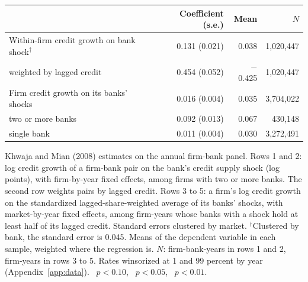 \begin{threeparttable}
    \begin{tabular}{@{}lrrr@{}}
        \toprule
         & Coefficient (s.e.) & Mean & $N$ \\
        \midrule
        Within-firm credit growth on bank shock$^{\dagger}$ & 0.131\sym{***} (0.021) & 0.038 & 1,020,447 \\
        \quad weighted by lagged credit & 0.454\sym{***} (0.052) & $-$0.425 & 1,020,447 \\
        Firm credit growth on its banks' shocks & 0.016\sym{***} (0.004) & 0.035 & 3,704,022 \\
        \quad two or more banks & 0.092\sym{***} (0.013) & 0.067 & 430,148 \\
        \quad single bank & 0.011\sym{***} (0.004) & 0.030 & 3,272,491 \\
        \bottomrule
    \end{tabular}
    \begin{tablenotes}[flushleft]
        \footnotesize
        \item Khwaja and Mian (2008) estimates on the annual firm-bank panel. Rows 1 and 2: log credit growth of a firm-bank pair on the bank's credit supply shock (log points), with firm-by-year fixed effects, among firms with two or more banks. The second row weights pairs by lagged credit. Rows 3 to 5: a firm's log credit growth on the standardized lagged-share-weighted average of its banks' shocks, with market-by-year fixed effects, among firm-years whose banks with a shock hold at least half of its lagged credit. Standard errors clustered by market. $^{\dagger}$Clustered by bank, the standard error is 0.045. Means of the dependent variable in each sample, weighted where the regression is. $N$: firm-bank-years in rows 1 and 2, firm-years in rows 3 to 5. Rates winsorized at 1 and 99 percent by year (Appendix~\ref{app:data}). \sym{*}~$p<0.10$, \sym{**}~$p<0.05$, \sym{***}~$p<0.01$.
    \end{tablenotes}
\end{threeparttable}
